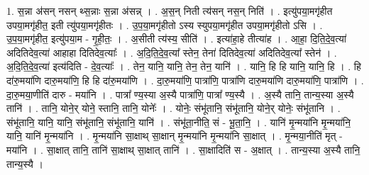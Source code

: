 \documentclass[17pt]{extarticle}
\begin{document}
1. स॒न्ना अ॑सन् नसन् थ्स॒न्नाः स॒न्ना अ॑सन्न् । . अ॒स॒न् निती त्य॑सन् नस॒न् निति॑ । . इत्यु॑पया॒मगृ॑हीत उपया॒मगृ॑हीत॒ इती त्यु॑पया॒मगृ॑हीतः । . उ॒प॒या॒मगृ॑हीतो ऽस्य स्युपया॒मगृ॑हीत उपया॒मगृ॑हीतो ऽसि । . उ॒प॒या॒मगृ॑हीत॒ इत्यु॑पया॒म - गृ॒ही॒तः॒ । . अ॒सीती त्य॑स्य॒ सीति॑ । . इत्या॑हा॒हे तीत्या॑ह । . आ॒हा॒ दि॒ति॒दे॒व॒त्या॑ अदितिदेव॒त्या॑ आहाहा दितिदेव॒त्याः᳚ । . अ॒दि॒ति॒दे॒व॒त्या᳚ स्तेन॒ तेना॑ दितिदेव॒त्या॑ अदितिदेव॒त्या᳚ स्तेन॑ । . अ॒दि॒ति॒दे॒व॒त्या॑ इत्य॑दिति - दे॒व॒त्याः᳚ । . तेन॒ यानि॒ यानि॒ तेन॒ तेन॒ यानि॑ । . यानि॒ हि हि यानि॒ यानि॒ हि । . हि दा॑रु॒मया॑णि दारु॒मया॑णि॒ हि हि दा॑रु॒मया॑णि । . दा॒रु॒मया॑णि॒ पात्रा॑णि॒ पात्रा॑णि दारु॒मया॑णि दारु॒मया॑णि॒ पात्रा॑णि । . दा॒रु॒मया॒णीति॑ दारु - मया॑नि । . पात्रा᳚ ण्य॒स्या अ॒स्यै पात्रा॑णि॒ पात्रा᳚ ण्य॒स्यै । . अ॒स्यै तानि॒ तान्य॒स्या अ॒स्यै तानि॑ । . तानि॒ योने॒र् योने॒ स्तानि॒ तानि॒ योनेः᳚ । . योनेः॒ संभू॑तानि॒ संभू॑तानि॒ योने॒र् योनेः॒ संभू॑तानि । . संभू॑तानि॒ यानि॒ यानि॒ संभू॑तानि॒ संभू॑तानि॒ यानि॑ । . संभू॑ता॒नीति॒ सं - भू॒ता॒नि॒ । . यानि॑ मृ॒न्मया॑नि मृ॒न्मया॑नि॒ यानि॒ यानि॑ मृ॒न्मया॑नि । . मृ॒न्मया॑नि सा॒क्षाथ् सा॒क्षान् मृ॒न्मया॑नि मृ॒न्मया॑नि सा॒क्षात् । . मृ॒न्मया॒नीति॑ मृत् - मया॑नि । . सा॒क्षात् तानि॒ तानि॑ सा॒क्षाथ् सा॒क्षात् तानि॑ । . सा॒क्षादिति॑ स - अ॒क्षात् । . तान्य॒स्या अ॒स्यै तानि॒ तान्य॒स्यै । \newline
\end{document}
